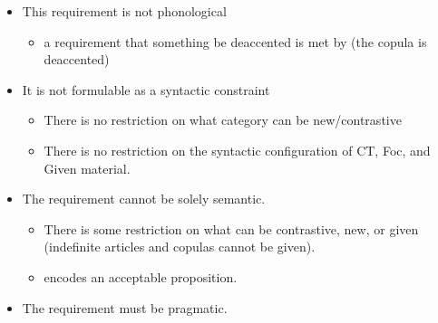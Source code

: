 \documentclass[GPFinal]{subfiles}
\begin{document}
\begin{itemize}
  \item This requirement is not phonological
    \begin{itemize}
      \item a requirement that something be deaccented is met by \Last (the copula is deaccented)
    \end{itemize}
  \item It is not formulable as a syntactic constraint
    \begin{itemize}
      \item There is no restriction on what category can be new/contrastive
      \item There is no restriction on the syntactic configuration of CT, Foc, and Given material.
    \end{itemize}
  \item The requirement cannot be solely semantic.
    \begin{itemize}
      \item There is some restriction on what can be contrastive, new, or given (indefinite articles and copulas cannot be given).
      \item \Last encodes an acceptable proposition.
    \end{itemize}
  \item The requirement must be pragmatic.
\end{itemize}
\end{document}
